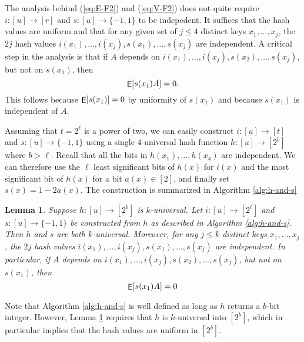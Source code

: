 \documentclass[12pt]{article}
\DeclareMathOperator*{\E}{\sf{E}}
\newcommand{\req}[1]{(\ref{#1})}
\newtheorem {lemma} {Lemma}[section]
\newcommand\fct\rightarrow
\begin{document}
The analysis behind \req{eq:E-F2} and \req{eq:V-F2} does not quite
require $i:[u]\fct[r]$ and $s:[u]\fct\{-1,1\}$ to be indepedent.
It suffices that the hash values are uniform and that for any
given set of $j\leq 4$ distinct keys $x_1,\ldots,x_j$, the $2j$ hash
values $i(x_1),\ldots,i(x_j),s(x_1),\ldots,s(x_j)$ are independent.
A critical step in the analysis is that if
$A$ depends on $i(x_1),\ldots,i(x_j),s(x_2),\ldots,s(x_j)$, but
not on $s(x_1)$, then
\[\E[s(x_1)A]=0.\]
This follows because $\E[s(x_1)]=0$ by uniformity of $s(x_1)$ and because $s(x_1)$ is independent of $A$.
  

Assuming that $t=2^\ell$ is a power of two, we can easily construct
$i:[u]\fct[t]$ and $s:[u]\fct\{-1,1\}$ using a single $4$-universal
hash function $h:[u]\fct[2^b]$ where $b>\ell$. Recall that all the bits in
$h(x_1),\ldots,h(x_4)$ are independent. We can therefore use the
$\ell$ least significant bits of $h(x)$ for $i(x)$ and the most
significant bit of $h(x)$ for a bit $a(x)\in[2]$, and finally set
$s(x)=1-2a(x)$. The construction is summarized in Algorithm \ref{alg:h-and-s}
\begin{lemma}\label{lem:b-bit-hashing} Suppose $h:[u]\fct[2^b]$ is $k$-universal. Let
  $i:[u]\fct[2^\ell]$ and
  $s:[u]\fct\{-1,1\}$ be constructed from $h$ as described in Algorithm \ref{alg:h-and-s}. Then $h$ and $s$ are both $k$-universal. Moreover, for
  any $j\leq k$ distinct keys $x_1,\ldots,x_j$, the $2j$ hash
  values $i(x_1),\ldots,i(x_j),s(x_1),\ldots,s(x_j)$ are independent.
  In particular, if $A$ depends on
  $i(x_1),\ldots,i(x_j),s(x_2),\ldots,s(x_j)$, but not on $s(x_1)$, then
\begin{equation}\label{eq:E-0}
  \E[s(x_1)A]=0
\end{equation}
\end{lemma}
Note that Algorithm \ref{alg:h-and-s} is well defined as long as 
$h$ returns a $b$-bit integer. However, Lemma \ref{lem:b-bit-hashing} requires
that $h$ is $k$-universal into $[2^b]$, which in particular implies that
the hash values are uniform in $[2^b]$.
\end{document}
